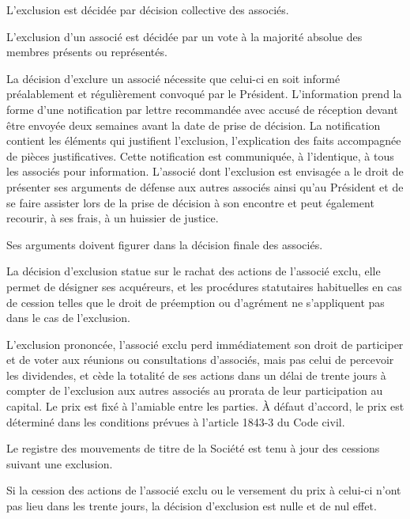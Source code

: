 \documentclass[a4paper,12pt]{report}
\begin{document}
L'exclusion est décidée par décision collective des associés.

L'exclusion d'un associé est décidée par un vote à la majorité absolue des membres présents ou représentés. 

La décision d'exclure un associé nécessite que celui-ci en soit informé préalablement et régulièrement convoqué par le Président. L'information prend la forme d'une notification par lettre recommandée avec accusé de réception devant être envoyée deux semaines avant la date de prise de décision. La notification contient les éléments qui justifient l'exclusion, l'explication des faits accompagnée de pièces justificatives. Cette notification est communiquée, à l'identique, à tous les associés pour information. L'associé dont l'exclusion est envisagée a le droit de présenter ses arguments de défense aux autres associés ainsi qu'au Président et de se faire assister lors de la prise de décision à son encontre et peut également recourir, à ses frais, à un huissier de justice.

Ses arguments doivent figurer dans la décision finale des associés.

La décision d'exclusion statue sur le rachat des actions de l'associé exclu, elle permet de désigner ses acquéreurs, et les procédures statutaires habituelles en cas de cession telles que le droit de préemption ou d'agrément ne s'appliquent pas dans le cas de l'exclusion.

L'exclusion prononcée, l'associé exclu perd immédiatement son droit de participer et de voter aux réunions ou consultations d'associés, mais pas celui de percevoir les dividendes, et cède la totalité de ses actions dans un délai de trente jours à compter de l'exclusion aux autres associés au prorata de leur participation au capital. Le prix est fixé à l'amiable entre les parties. À défaut d'accord, le prix est déterminé dans les conditions prévues à l'article 1843-3 du Code civil.

Le registre des mouvements de titre de la Société est tenu à jour des cessions suivant une exclusion.

Si la cession des actions de l'associé exclu ou le versement du prix à celui-ci n'ont pas lieu dans les trente jours, la décision d'exclusion est nulle et de nul effet.

%
%
%
%
\end{document}
